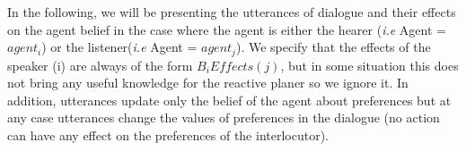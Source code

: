 \documentclass{llncs}
\begin{document}
In the following, we will be presenting  the utterances of dialogue and their effects on the agent belief in the case where the agent is either the hearer (\textit{i.e} Agent = $agent_i$) or  the listener(\textit{i.e} Agent = $agent_j$). We specify that the effects of the speaker (i)  are always of the form $B_i Effects(j)$, but in some situation this does not bring any useful knowledge for the reactive planer so we ignore it. In addition, utterances update only the belief of the agent about preferences but at any case utterances change the values of preferences in the dialogue (no action can have any effect on the preferences of the interlocutor). 

\end{document}
